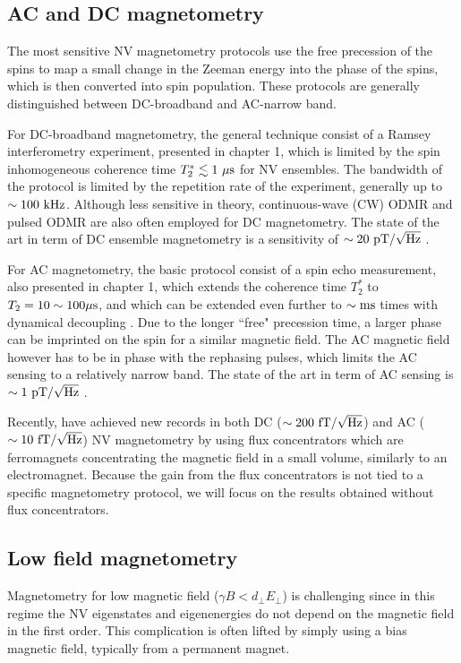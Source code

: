 \documentclass[a4paper,11pt]{report}
\begin{document}
\begin{refsection}
\subsection{AC and DC magnetometry}
The most sensitive NV magnetometry protocols use the free precession of the spins to map a small change in the Zeeman energy into the phase of the spins, which is then converted into spin population. These protocols are generally distinguished between DC-broadband and AC-narrow band.

For DC-broadband magnetometry, the general technique consist of a Ramsey interferometry experiment, presented in chapter 1, which is limited by the spin inhomogeneous coherence time $T_2^* \lesssim 1\ \rm{\mu s}$ for NV ensembles. The bandwidth of the protocol is limited by the repetition rate of the experiment, generally up to $\sim 100\ \rm kHz$. Although less sensitive in theory, continuous-wave (CW) ODMR and pulsed ODMR are also often employed for DC magnetometry. The state of the art in term of DC ensemble magnetometry is a sensitivity of $\sim 20\ \rm pT/ \sqrt{\rm Hz}$ \citep{barry2016optical, chatzidrosos2017miniature}.

For AC magnetometry, the basic protocol consist of a spin echo measurement, also presented in chapter 1, which extends the coherence time $T_2^*$ to $T_2 = 10 \sim 100 \rm{\mu s}$, and which can be extended even further to $\sim \rm ms$ times with dynamical decoupling \citep{pham2012enhanced}. Due to the longer ``free" precession time, a larger phase can be imprinted on the spin for a similar magnetic field. The AC magnetic field however has to be in phase with the rephasing pulses, which limits the AC sensing to a relatively narrow band. The state of the art in term of AC sensing is $\sim 1\ \rm pT/\sqrt{\rm Hz}$ \citep{wolf2015subpicotesla}.

Recently, \citep{xie2021hybrid} have achieved new records in both DC ($\sim 200\ \rm fT/\sqrt{\rm Hz}$) and AC ($\sim 10\ \rm fT/\sqrt{\rm Hz}$) NV magnetometry by using flux concentrators which are ferromagnets concentrating the magnetic field in a small volume, similarly to an electromagnet. Because the gain from the flux concentrators is not tied to a specific magnetometry protocol, we will focus on the results obtained without flux concentrators.
\subsection{Low field magnetometry}
Magnetometry for low magnetic field ($\gamma B < d_\perp E_\perp$) is challenging since in this regime the NV eigenstates and eigenenergies do not depend on the magnetic field in the first order. This complication is often lifted  by simply using a bias magnetic field, typically from a permanent magnet. 


\end{refsection}
\end{document}
